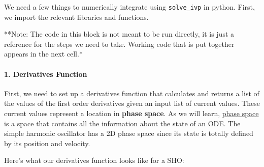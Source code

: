 We need a few things to numerically integrate using \texttt{solve\_ivp}
in python. First, we import the relevant libraries and functions.

\begin{Shaded}
\begin{Highlighting}[]
\end{Highlighting}
\end{Shaded}

**Note: The code in this block is not meant to be run directly, it is
just a reference for the steps we need to take. Working code that is put
together appears in the next cell.*

\paragraph{1. Derivatives Function}\label{derivatives-function}

First, we need to set up a derivatives function that calculates and
returns a list of the values of the first order derivatives given an
input list of current values. These current values represent a location
in \textbf{phase space}. As we will learn,
\href{https://en.wikipedia.org/wiki/Phase_space}{phase space} is a space
that contains all the information about the state of an ODE. The simple
harmonic oscillator has a 2D phase space since its state is totally
defined by its position and velocity.

Here's what our derivatives function looks like for a SHO:

\begin{Shaded}
\begin{Highlighting}[]
\OperatorTok{=}
    
\OperatorTok{=} \OperatorTok{{-}}\OperatorTok{*}

\end{Highlighting}
\end{Shaded}

